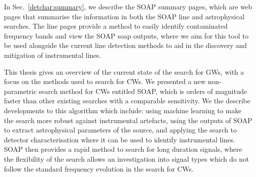 In Sec.~\ref{detchar:summary}, we describe the SOAP summary pages, which are web pages that summarise the information in both the SOAP line and astrophysical searches.
The line pages provide a method to easily identify contaminated frequency bands and view the SOAP soap outputs, where we aim for this tool to be used alongside the current line detection methods to aid in the discovery and mitigation of instrumental lines.

\bigskip

This thesis gives an overview of the current state of the search for \glspl{GW}, with a focus on the methods used to search for \glspl{CW}.
We presented a new non-parametric search method for \glspl{CW} entitled SOAP, which is orders of magnitude faster than other existing searches with a comparable sensitivity.
We the describe developments to this algorithm which include: using machine learning to make the search more robust against instrumental artefacts, using the outputs of SOAP to extract astrophysical parameters of the source, and applying the search to detector characterisation where it can be used to identify instrumental lines.
SOAP then provides a rapid method to search for long duration signals, where the flexibility of the search allows an investigation into signal types which do not follow the standard frequency evolution in the search for \glspl{CW}.











